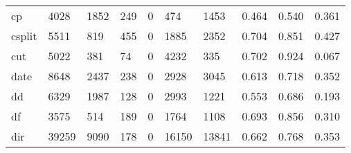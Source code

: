 \begin{longtable}{lp{2.0cm}p{2.0cm}p{2.0cm}p{2.0cm}p{2.0cm}p{2.0cm}p{2.0cm}p{2.0cm}p{2.0cm}}
cp        &                   4028 &                               1852 &                               249 &                                0 &                               474 &                            1453 &                                   0.464 &                                  0.540 &                                0.361 \\
csplit    &                   5511 &                                819 &                               455 &                                0 &                              1885 &                            2352 &                                   0.704 &                                  0.851 &                                0.427 \\
cut       &                   5022 &                                381 &                                74 &                                0 &                              4232 &                             335 &                                   0.702 &                                  0.924 &                                0.067 \\
date      &                   8648 &                               2437 &                               238 &                                0 &                              2928 &                            3045 &                                   0.613 &                                  0.718 &                                0.352 \\
dd        &                   6329 &                               1987 &                               128 &                                0 &                              2993 &                            1221 &                                   0.553 &                                  0.686 &                                0.193 \\
df        &                   3575 &                                514 &                               189 &                                0 &                              1764 &                            1108 &                                   0.693 &                                  0.856 &                                0.310 \\
dir       &                  39259 &                               9090 &                               178 &                                0 &                             16150 &                           13841 &                                   0.662 &                                  0.768 &                                0.353 \\

\end{longtable}
